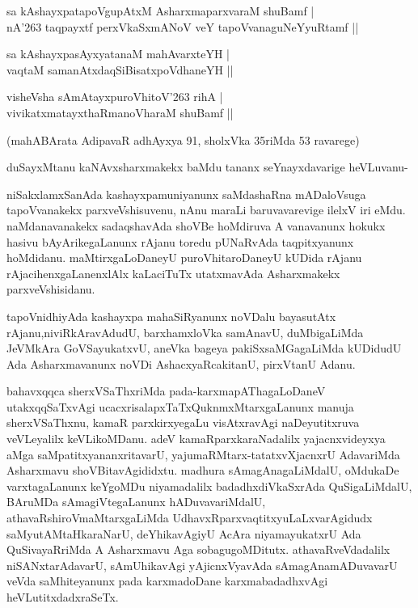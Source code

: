 \begin{shloka}
sa kAshayxpatapoVgupAtxM AsharxmaparxvaraM shuBamf |\\
nA\char'263 taqpayxtf perxVkaSxmANoV veY tapoVvanaguNeYyuRtamf ||
\end{shloka}

\begin{shloka}
sa kAshayxpasAyxyatanaM mahAvarxteYH |\\
vaqtaM samanAtxdaqSiBisatxpoVdhaneYH ||
\end{shloka}

\begin{shloka}
visheVsha sAmAtayxpuroVhitoV\char'263 rihA |\\
vivikatxmatayxthaRmanoVharaM shuBamf ||
\end{shloka}

\noindent
(mahABArata AdipavaR adhAyxya 91, sholxVka 35riMda 53 ravarege)

\noindent
duSayxMtanu kaNAvxsharxmakekx baMdu tananx seYnayxdavarige heVLuvanu-

\smallskip
niSakxlamxSanAda kashayxpamuniyanunx saMdashaRna mADaloVsuga tapoVvanakekx parxveVshisuvenu, nAnu maraLi baruvavarevige ilelxV iri eMdu. naMdanavanakekx sadaqshavAda shoVBe hoMdiruva A vana\-vanunx hokukx hasivu bAyArikegaLanunx rAjanu toredu pUNaRvAda taqpitxyanunx hoMdidanu. maMtirx\-gaLoDa\-neyU puroVhitaroDaneyU kUDida rAjanu rAjacihenxgaLanenxlAlx kaLaciTuTx utatxma\-vAda Asharxmakekx parxveVshisidanu.

tapoVnidhiyAda kashayxpa mahaSiRyanunx noVDalu bayasutAtx rAjanu,\break niviRkAravAdudU, barxhamx\-loVka samAnavU, duMbigaLiMda JeVMkAra GoVSa\-yukatxvU, aneVka bageya pakiSxsaMGagaLiMda kUDi\-dudU Ada Asharxmavanunx noVDi AshacxyaRcakitanU, pirxVtanU Adanu.

bahavxqqca sherxVSaThxriMda pada-karxmapAThagaLoDaneV utakxqqSaTxvAgi ucacxrisalapxTaTx\break QuknmxMtarx\-gaLanunx manuja sherxVSaThxnu, kamaR parxkirxyegaLu visAtxravAgi naDeyutitxruva veVLeyalilx keVLikoMDanu. adeV kamaRparxkaraNa\-dalilx yajacnx\-videyxya aMga saMpatitx\-yananxritavarU, yajumaRMtarx-tatatxvXjacnxrU AdavariMda Asharxmavu shoV\-Bita\-vAgi\-didxtu. madhura sAmagAnagaLiMdalU, oMdukaDe varxtagaLanunx keYgoMDu niyama\-dalilx badadhxdiVkaSx\-rAda QuSigaLiMdalU, BAruMDa sAmagiVtegaLanunx hADuvava\break\-riMdalU, athavaRshiroVmaMtarxgaLiMda UdhavxRparxvaqtitxyuLaLxvarAgidudx saMyu\-tAMtaHkaraNarU, deYhikavAgiyU AcAra niyamayukatxrU Ada QuSivayaR\-riMda A Asharxmavu Aga sobagugoMDitutx. athavaRveVdadalilx niSANxtarAdavarU, sAmUhika\-vAgi yAjicnxVyavAda sAmagAnamADuvavarU veVda saMhiteyanunx pada karxmadoDane karxma\-badadhxvAgi heVLutitxdadxraSeTx.

